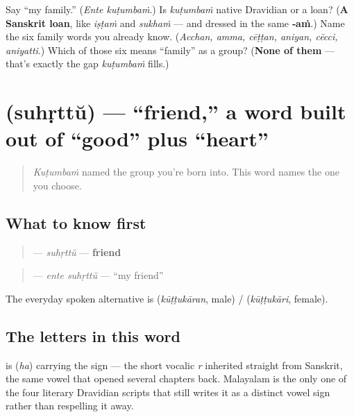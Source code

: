 \begin{tcolorbox}[breakable,colback=teal!4,colframe=teal!35!black,title={Before you move on}]
Say \textquotedblleft{}my family.\textquotedblright{} (\emph{Ente kuṭumbaṁ}.) Is \emph{kuṭumbaṁ} native Dravidian or a loan? (\textbf{A Sanskrit loan}, like \emph{iṣṭaṁ} and \emph{sukhaṁ} — and dressed in the same \textbf{‑aṁ}.) Name the six family words you already know. (\emph{Acchan, amma, cēṭṭan, aniyan, cēcci, aniyatti}.) Which of those six means \textquotedblleft{}family\textquotedblright{} as a group? (\textbf{None of them} — that's exactly the gap \emph{kuṭumbaṁ} fills.)
\end{tcolorbox}
\section[\texorpdfstring{\ml{സുഹൃത്ത്} (suhṛttŭ)}{സുഹൃത്ത് (suhṛttŭ)}]{ (suhṛttŭ) — \textquotedblleft{}friend,\textquotedblright{} a word built out of \textquotedblleft{}good\textquotedblright{} plus \textquotedblleft{}heart\textquotedblright{}}

\label{lesson:ML-C35-suhruthu}



\begin{quote}
\emph{Kuṭumbaṁ} named the group you're born into. This word names the one you choose.
\end{quote}

\subsection*{What to know first}
\begin{quote}
\textbf{} — \emph{suhṛttŭ} — \textbf{friend}
\end{quote}

\begin{quote}
\textbf{ } — \emph{ente suhṛttŭ} — \textquotedblleft{}my friend\textquotedblright{}
\end{quote}

The everyday spoken alternative is \textbf{} (\emph{kūṭṭukāran}, male) / \textbf{} (\emph{kūṭṭukāri}, female).

\subsection*{The letters in this word}
\textbf{} is \textbf{} (\emph{ha}) carrying the \textbf{} sign — the short vocalic \emph{r} inherited straight from Sanskrit, the same vowel that opened \textbf{} several chapters back. Malayalam is the only one of the four literary Dravidian scripts that still writes it as a distinct vowel sign rather than respelling it away.

